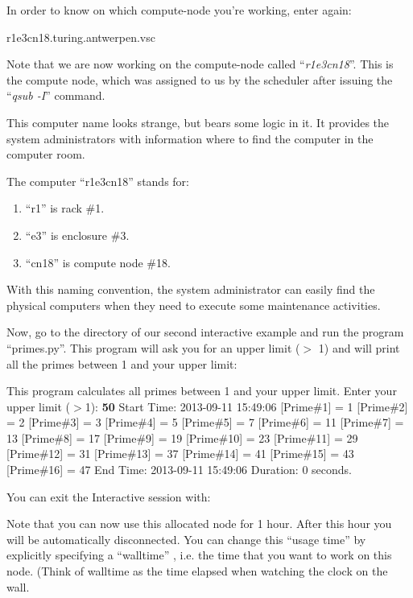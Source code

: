 In order to know on which compute-node you're working, enter again:
\begin{prompt}
r1e3cn18.turing.antwerpen.vsc
\end{prompt}

Note that we are now working on the compute-node called ``\emph{r1e3cn18}''.
This is the compute node, which was assigned to us by the scheduler after
issuing the ``\emph{qsub -I}'' command.

This computer name looks strange, but bears some logic in it.  It provides the
system administrators with information where to find the computer in the
computer room.

The computer ``r1e3cn18'' stands for:

\begin{enumerate}
\item  ``r1'' is rack \#1.
\item  ``e3'' is enclosure \#3.
\item  ``cn18'' is compute node \#18.
\end{enumerate}

With this naming convention, the system administrator can easily find the
physical computers when they need to execute some maintenance activities.

Now, go to the directory of our second interactive example and run the program
``primes.py''. This program will ask you for an upper limit ($>$ 1) and will
print all the primes between 1 and your upper limit:

\begin{prompt}
This program calculates all primes between 1 and your upper limit.
Enter your upper limit ($>$1):   \textbf{50 }
Start Time:  2013-09-11 15:49:06
[Prime\#1] = 1
[Prime\#2] = 2
[Prime\#3] = 3
[Prime\#4] = 5
[Prime\#5] = 7
[Prime\#6] = 11
[Prime\#7] = 13
[Prime\#8] = 17
[Prime\#9] = 19
[Prime\#10] = 23
[Prime\#11] = 29
[Prime\#12] = 31
[Prime\#13] = 37
[Prime\#14] = 41
[Prime\#15] = 43
[Prime\#16] = 47
End Time:  2013-09-11 15:49:06
Duration:  0 seconds.
\end{prompt}

You can exit the Interactive session with:
\begin{prompt}
$ %
\end{prompt}

Note that you can now use this allocated node for 1 hour.  After this hour you will be automatically disconnected. You can change this ``usage time'' by explicitly specifying a ``walltime'' , i.e. the time that you want to work on this node.  (Think of walltime as the time elapsed when watching the clock on the wall.

